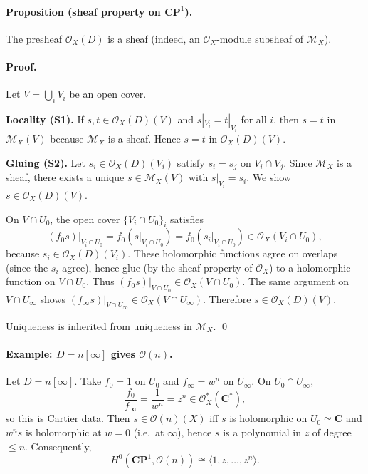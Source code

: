 \documentclass[11pt,openany]{article}
\renewcommand{\emph}[1]{\textbf{#1}}
\begin{document}
\paragraph{Proposition (sheaf property on $\mathbf{CP}^1$).}
The presheaf $\mathcal O_X(D)$ is a sheaf (indeed, an $\mathcal O_X$-module subsheaf of $\mathcal M_X$).

\paragraph{Proof.}
Let $V=\bigcup_i V_i$ be an open cover.

\smallskip
\noindent\emph{Locality (S1).}
If $s,t\in\mathcal O_X(D)(V)$ and $s|_{V_i}=t|_{V_i}$ for all $i$, then $s=t$ in $\mathcal M_X(V)$
because $\mathcal M_X$ is a sheaf. Hence $s=t$ in $\mathcal O_X(D)(V)$.

\smallskip
\noindent\emph{Gluing (S2).}
Let $s_i\in\mathcal O_X(D)(V_i)$ satisfy $s_i=s_j$ on $V_i\cap V_j$.
Since $\mathcal M_X$ is a sheaf, there exists a unique $s\in\mathcal M_X(V)$ with $s|_{V_i}=s_i$.
We show $s\in\mathcal O_X(D)(V)$.

On $V\cap U_0$, the open cover $\{V_i\cap U_0\}_i$ satisfies
\[
(f_0 s)|_{V_i\cap U_0}=f_0(s|_{V_i\cap U_0})=f_0(s_i|_{V_i\cap U_0})\in \mathcal O_X(V_i\cap U_0),
\]
because $s_i\in\mathcal O_X(D)(V_i)$. These holomorphic functions agree on overlaps
(since the $s_i$ agree), hence glue (by the sheaf property of $\mathcal O_X$) to a holomorphic function
on $V\cap U_0$. Thus $(f_0 s)|_{V\cap U_0}\in \mathcal O_X(V\cap U_0)$.
The same argument on $V\cap U_\infty$ shows $(f_\infty s)|_{V\cap U_\infty}\in \mathcal O_X(V\cap U_\infty)$.
Therefore $s\in\mathcal O_X(D)(V)$.

Uniqueness is inherited from uniqueness in $\mathcal M_X$. \qed

\paragraph{Example: $D=n[\infty]$ gives $\mathcal O(n)$.}
Let $D=n[\infty]$. Take $f_0=1$ on $U_0$ and $f_\infty=w^n$ on $U_\infty$.
On $U_0\cap U_\infty$,
\[
\frac{f_0}{f_\infty}=\frac{1}{w^n}=z^n\in \mathcal O_X^*(\mathbf C^*),
\]
so this is Cartier data.
Then $s\in \mathcal O(n)(X)$ iff $s$ is holomorphic on $U_0\simeq \mathbf C$ and $w^n s$ is holomorphic
at $w=0$ (i.e.\ at $\infty$), hence $s$ is a polynomial in $z$ of degree $\le n$.
Consequently,
\[
H^0(\mathbf{CP}^1,\mathcal O(n))\cong \langle 1,z,\dots,z^n\rangle.
\]
\end{document}
